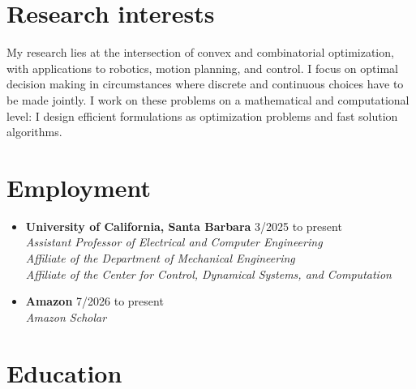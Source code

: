 \documentclass[11pt,a4paper,sans,twoside]{moderncv}
\begin{document}
\makecvtitle

\section{Research interests}

My research lies at the intersection of convex and combinatorial optimization, with applications to robotics, motion planning, and control.
I focus on optimal decision making in circumstances where discrete and continuous choices have to be made jointly.
I work on these problems on a mathematical and computational level: I design efficient formulations as optimization problems and fast solution algorithms.

\section{Employment}

\begin{itemize}


\item \textbf{University of California, Santa Barbara} \hfill 3/2025 to present \\
\textit{Assistant Professor of Electrical and Computer Engineering} \\
\textit{Affiliate of the Department of Mechanical Engineering} \\
\textit{Affiliate of the Center for Control, Dynamical Systems, and Computation}

\item \textbf{Amazon} \hfill 7/2026 to present \\
\textit{Amazon Scholar} 

\end{itemize}

\section{Education}
\end{document}
